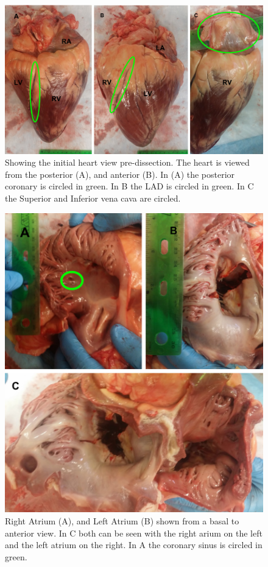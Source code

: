 \documentclass[12pt]{article}
\begin{document}
\begin{figure}[H]

	\centering	
	\includegraphics[width = 1\textwidth]{Figures/Heart1.png}
	\caption{ Showing the initial heart view pre-dissection. The heart is viewed from the posterior (A), and anterior (B). In (A) the posterior coronary is circled in green. In B the LAD is circled in green. In C the Superior and Inferior vena cava are circled.}
	\label{fig:H1}
\end{figure}
\begin{figure}[H]
	
	\centering	
	\includegraphics[width = 1\textwidth]{Figures/Heart2.png}
	\caption{Right Atrium (A), and Left Atrium (B) shown from a basal to anterior view. In C both can be seen with the right arium on the left and the left atrium on the right. In A the coronary sinus is circled in green.}
	\label{fig:H2}
\end{figure}
\end{document}
